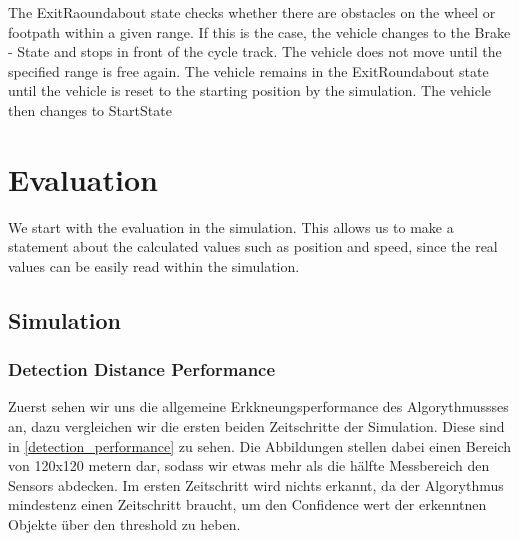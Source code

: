 \documentclass[11pt,oneside,openright]{mpreport}
\begin{document}
The ExitRaoundabout state checks whether there are obstacles on the wheel or footpath within a given range.
If this is the case, the vehicle changes to the Brake - State and stops in front of the cycle track. The vehicle does not move until the specified range is free again.
The vehicle remains in the ExitRoundabout state until the vehicle is reset to the starting position by the simulation.
The vehicle then changes to StartState



\chapter{Evaluation}


We start with the evaluation in the simulation. This allows us to make a statement about the calculated values ​​such as position and speed, since the real values can be easily read within the simulation.

\section{Simulation}


\subsection{Detection Distance Performance}
Zuerst sehen wir uns die allgemeine Erkkneungsperformance des Algorythmussses an, dazu vergleichen wir die ersten beiden Zeitschritte der Simulation.
Diese sind in \cref{detection_performance} zu sehen. Die Abbildungen stellen dabei einen Bereich von 120x120 metern dar, sodass wir etwas mehr als die hälfte Messbereich den Sensors abdecken.
Im ersten Zeitschritt wird nichts erkannt, da der Algorythmus mindestenz einen Zeitschritt braucht, um den Confidence wert der erkenntnen Objekte über den threshold zu heben.
\end{document}
